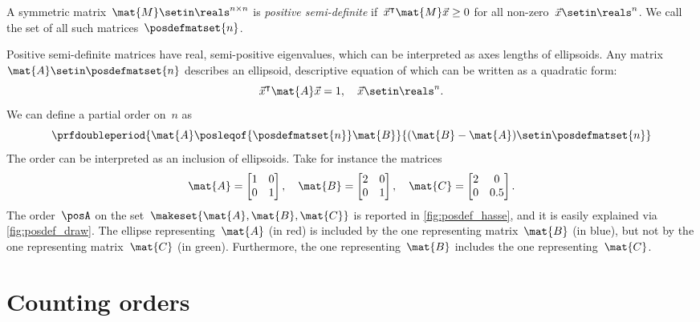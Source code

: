 \begin{definition}
        A symmetric matrix~$\mat{M}\setin \reals^{n\times n}$ is \emph{positive semi-definite} if~$\vec{x}^\intercal \mat{M}\vec{x}\geq 0$ for all non-zero~$\vec{x}\setin \reals^n$.
        We call the set of all such matrices~$\posdefmatset{n}$.
    \end{definition}
    Positive semi-definite matrices have real, semi-positive eigenvalues, which can be interpreted as axes lengths of ellipsoids.
    Any matrix~$\mat{A}\setin \posdefmatset{n}$ describes an ellipsoid, descriptive equation of which can be written as a quadratic form:
    \begin{equation}
        \vec{x}^\intercal \mat{A}\vec{x}=1,\quad \vec{x}\setin \reals^n.
    \end{equation}
    We can define a partial order on~$n$ as
    \begin{equation}
        \prfdoubleperiod{
            \mat{A}\posleqof{\posdefmatset{n}} \mat{B}
        }{
            (\mat{B}-\mat{A})\setin \posdefmatset{n}
        }
    \end{equation}
    The order can be interpreted as an inclusion of ellipsoids.
    Take for instance the matrices
    \begin{equation}
        \mat{A}=
        \begin{bmatrix}
            1 & 0 \\0& 1
        \end{bmatrix}, \quad \mat{B}=
        \begin{bmatrix}
            2 & 0 \\0& 1
        \end{bmatrix},\quad \mat{C}=
        \begin{bmatrix}
            2 & 0 \\0& 0.5
        \end{bmatrix}.
    \end{equation}
    The order~$\posA$ on the set~$\makeset{\mat{A},\mat{B},\mat{C}}$ is reported in \cref{fig:posdef_hasse}, and it is easily explained via \cref{fig:posdef_draw}.
    The ellipse representing~$\mat{A}$ (in red) is included by the one representing matrix~$\mat{B}$ (in blue), but not by the one representing matrix~$\mat{C}$ (in green).
    Furthermore, the one representing~$\mat{B}$ includes the one representing~$\mat{C}$.



\section{Counting orders}

